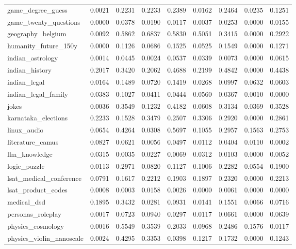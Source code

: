 \begin{landscape}
\begin{longtable}{@{}p{3.8cm}cccccccc@{}}
game\_degree\_guess & 0.0021 & 0.2231 & 0.2233 & 0.2389 & 0.0162 & 0.2464 & 0.0235 & 0.1251 \\
game\_twenty\_questions & 0.0000 & 0.0378 & 0.0190 & 0.0117 & 0.0037 & 0.0253 & 0.0000 & 0.0155 \\
geography\_belgium & 0.0092 & 0.5862 & 0.6837 & 0.5830 & 0.5051 & 0.3415 & 0.0000 & 0.2922 \\
humanity\_future\_150y & 0.0000 & 0.1126 & 0.0686 & 0.1525 & 0.0525 & 0.1549 & 0.0000 & 0.1271 \\
indian\_astrology & 0.0014 & 0.0445 & 0.0024 & 0.0537 & 0.0339 & 0.0073 & 0.0000 & 0.0615 \\
indian\_history & 0.2017 & 0.3420 & 0.2062 & 0.4688 & 0.2199 & 0.4842 & 0.0000 & 0.4438 \\
indian\_legal & 0.0164 & 0.1489 & 0.0720 & 0.1419 & 0.0268 & 0.0997 & 0.0632 & 0.0603 \\
indian\_legal\_family & 0.0383 & 0.1027 & 0.0411 & 0.0444 & 0.0560 & 0.0367 & 0.0010 & 0.0000 \\
jokes & 0.0036 & 0.3549 & 0.1232 & 0.4182 & 0.0608 & 0.3134 & 0.0369 & 0.3528 \\
karnataka\_elections & 0.2233 & 0.1528 & 0.3479 & 0.2507 & 0.3306 & 0.2920 & 0.0000 & 0.2861 \\
linux\_audio & 0.0654 & 0.4264 & 0.0308 & 0.5697 & 0.1055 & 0.2957 & 0.1563 & 0.2753 \\
literature\_camus & 0.0827 & 0.0621 & 0.0056 & 0.0497 & 0.0112 & 0.0404 & 0.0110 & 0.0002 \\
llm\_knowledge & 0.0315 & 0.0035 & 0.0227 & 0.0069 & 0.0312 & 0.0103 & 0.0000 & 0.0052 \\
logic\_puzzle & 0.0113 & 0.2971 & 0.0820 & 0.1127 & 0.1006 & 0.2282 & 0.0554 & 0.1900 \\
lsat\_medical\_conference & 0.0791 & 0.1617 & 0.2212 & 0.1903 & 0.1897 & 0.2320 & 0.0000 & 0.2213 \\
lsat\_product\_codes & 0.0008 & 0.0003 & 0.0158 & 0.0026 & 0.0000 & 0.0061 & 0.0000 & 0.0000 \\
medical\_dsd & 0.1895 & 0.3432 & 0.0281 & 0.0931 & 0.0141 & 0.1551 & 0.0066 & 0.0716 \\
personas\_roleplay & 0.0017 & 0.0723 & 0.0940 & 0.0297 & 0.0117 & 0.0661 & 0.0000 & 0.0639 \\
physics\_cosmology & 0.0016 & 0.5549 & 0.3539 & 0.2033 & 0.0968 & 0.2486 & 0.1576 & 0.0117 \\
physics\_violin\_nanoscale & 0.0024 & 0.4295 & 0.3353 & 0.0398 & 0.1217 & 0.1732 & 0.0000 & 0.1243 \\

\end{longtable}
\end{landscape}
